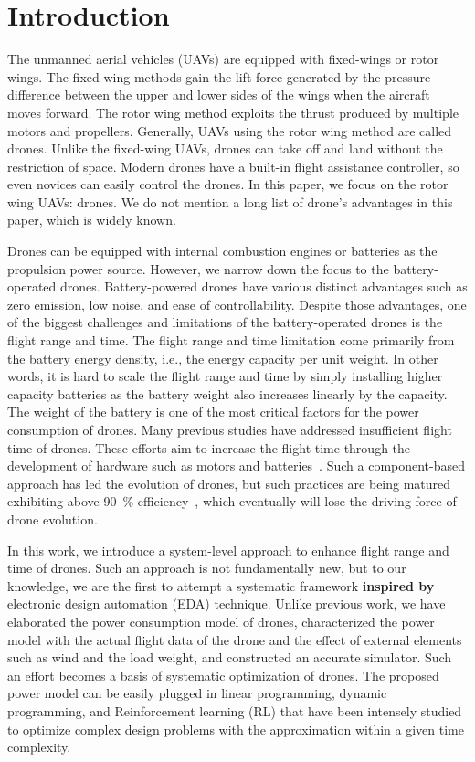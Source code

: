 \documentclass[journal]{./template/IEEEtran}
\begin{document}
\section{Introduction}
\label{Section: introduction}

The unmanned aerial vehicles (UAVs) are equipped with fixed-wings or rotor wings. 
The fixed-wing methods gain the lift force generated by the pressure difference between the upper and lower sides of the wings when the aircraft moves forward. 
The rotor wing method exploits the thrust produced by multiple motors and propellers. Generally, UAVs using the rotor wing method are called drones. Unlike the fixed-wing UAVs, drones can take off and land without the restriction of space. 
Modern drones have a built-in flight assistance controller, so even novices can easily control the drones. 
In this paper, we focus on the rotor wing UAVs: drones. We do not mention a long list of drone's advantages in this paper, which is widely known. 

Drones can be equipped with internal combustion engines or batteries as the propulsion power source. However, we narrow down the focus to the battery-operated drones.
Battery-powered drones have various distinct advantages such as zero emission, low noise, and ease of controllability.
Despite those advantages, one of the biggest challenges and limitations of the battery-operated drones is the flight range and time. 
The flight range and time limitation come primarily from the battery energy density, i.e., the energy capacity per unit weight.
In other words, it is hard to scale the flight range and time by simply installing higher capacity batteries as the battery weight also increases linearly by the capacity. 
The weight of the battery is one of the most critical factors for the power consumption of drones. 
Many previous studies have addressed insufficient flight time of drones. 
These efforts aim to increase the flight time through the development of hardware such as motors and batteries~\cite{ref_1}.
Such a component-based approach has led the evolution of drones, but such practices are being matured exhibiting above 90~\% efficiency~\cite{ref_2}, which eventually will lose the driving force of drone evolution. 

In this work, we introduce a system-level approach to enhance flight range and time of drones.
Such an approach is not fundamentally new, but to our knowledge, we are the first to attempt a systematic framework \textbf{inspired by} electronic design automation (EDA) technique.
Unlike previous work, we have elaborated the power consumption model of drones, characterized the power model with the actual flight data of the drone and the effect of external elements such as wind and the load weight, and constructed an accurate simulator.
Such an effort becomes a basis of systematic optimization of drones.
The proposed power model can be easily plugged in linear programming, dynamic programming, and Reinforcement learning (RL) that have been intensely studied to optimize complex design problems with the approximation within a given time complexity.
\end{document}
